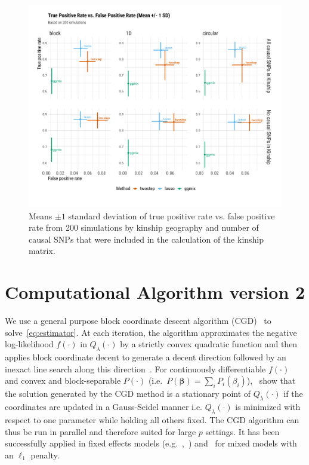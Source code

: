 \documentclass[12pt,letter]{article}\usepackage[]{graphicx}\usepackage[]{color}
\newenvironment{knitrout}{}{} %
\newcommand{\bbeta}{\boldsymbol{\beta}}
\begin{document}
\begin{knitrout}\scriptsize
{}\color{fgcolor}\begin{figure}[H]

{\centering \includegraphics[width=1\linewidth]{figure/plot-tpr-fpr-sim-1} 

}

\caption[Means $\pm 1$ standard deviation of true positive rate vs]{Means $\pm 1$ standard deviation of true positive rate vs. false positive rate from 200 simulations by kinship geography and number of causal SNPs that were included in the calculation of the kinship matrix.}\label{fig:plot-tpr-fpr-sim}
\end{figure}


\end{knitrout}




\newpage
\section{Computational Algorithm version 2}

We use a general purpose block coordinate descent algorithm (CGD)~\citep{tseng2009coordinate} to solve~\eqref{eq:estimator}. At each iteration, the algorithm approximates the negative log-likelihood $f(\cdot)$ in $Q_{\lambda}(\cdot)$ by a strictly convex quadratic function and then applies block coordinate decent to generate a decent direction followed by an inexact line search along this direction~\citep{tseng2009coordinate}. For continuously differentiable $f(\cdot)$ and convex and block-separable $P(\cdot)$ \mbox{(i.e. $P(\bbeta) = \sum_i P_i (\beta_i)$)},~\cite{tseng2009coordinate} show that the solution generated by the CGD method is a stationary point of $Q_{\lambda}(\cdot)$ if the coordinates are updated in a Gauss-Seidel manner i.e. $Q_{\lambda}(\cdot)$ is minimized with respect to one parameter while holding all others fixed. The CGD algorithm can thus be run in parallel and therefore suited for large $p$ settings. It has been successfully applied in fixed effects models (e.g.~\cite{meier2008group},~\cite{friedman2010regularization}) and~\cite{schelldorfer2011estimation} for mixed models with an $\ell_1$ penalty.
\end{document}
